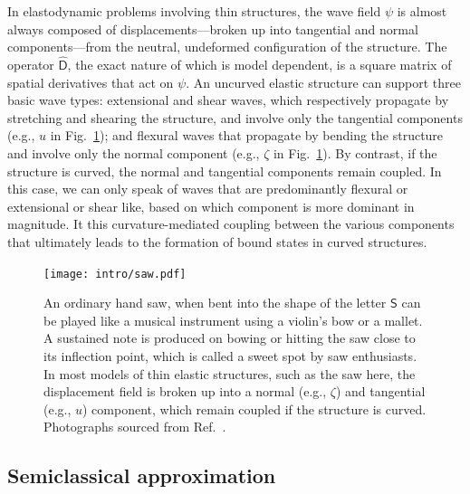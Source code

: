 In elastodynamic problems involving thin structures, the wave field $\psi$ is almost always composed of displacements---broken up into tangential and normal components---from the neutral, undeformed configuration of the structure.
The operator $\widehat{\mathsf{D}}$, the exact nature of which is model dependent, is a square matrix of spatial derivatives that act on $\psi$.
An uncurved elastic structure can support three basic wave types: extensional and shear waves, which respectively propagate by stretching and shearing the structure, and involve only the tangential components (e.g., $u$ in Fig.~\ref{fig:saw}); and flexural waves that propagate by bending the structure and involve only the normal component (e.g., $\zeta$ in Fig.~\ref{fig:saw}).
By contrast, if the structure is curved, the normal and tangential components remain coupled. 
In this case, we can only speak of waves that are predominantly flexural or extensional or shear like, based on which component is more dominant in magnitude.
It this curvature-mediated coupling between the various components that ultimately leads to the formation of bound states in curved structures.
%
\begin{figure}
  \begin{center}
    \texttt{[image: intro/saw.pdf]}
  \end{center}
  \caption{%
    An ordinary hand saw, when bent into the shape of the letter $\mathsf{S}$ can be played like a musical instrument using a violin's bow or a mallet.
    A sustained note is produced on bowing or hitting the saw close to its inflection point, which is called a sweet spot by saw enthusiasts.
    In most models of thin elastic structures, such as the saw here, the displacement field is broken up into a normal (e.g., $\zeta$) and tangential (e.g., $u$) component, which remain coupled if the structure is curved.
    Photographs sourced from Ref.~\cite{shankar2022}.
  }
  \label{fig:saw}
\end{figure}

\subsection{Semiclassical approximation}

